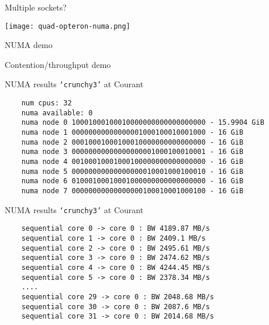 \documentclass[english,compress]{beamer}
\begin{document}
\begin{frame}{Multiple sockets?}
  \begin{center}
    \texttt{[image: quad-opteron-numa.png]}
  \end{center}
  \uncover<+->{}
\end{frame}
\begin{frame}{NUMA demo}
  \begin{center}
  \Huge Contention/throughput demo
  \end{center}
\end{frame}
\begin{frame}[fragile]{NUMA results}
  \texttt{`crunchy3'} at Courant

  \medskip
  \begin{lstlisting}
    num cpus: 32
    numa available: 0
    numa node 0 10001000100010000000000000000000 - 15.9904 GiB
    numa node 1 00000000000000001000100010001000 - 16 GiB
    numa node 2 00010001000100010000000000000000 - 16 GiB
    numa node 3 00000000000000000001000100010001 - 16 GiB
    numa node 4 00100010001000100000000000000000 - 16 GiB
    numa node 5 00000000000000000010001000100010 - 16 GiB
    numa node 6 01000100010001000000000000000000 - 16 GiB
    numa node 7 00000000000000000100010001000100 - 16 GiB
  \end{lstlisting}
\end{frame}
\begin{frame}[fragile]{NUMA results}
  \texttt{`crunchy3'} at Courant

  \medskip
  \begin{lstlisting}
    sequential core 0 -> core 0 : BW 4189.87 MB/s
    sequential core 1 -> core 0 : BW 2409.1 MB/s
    sequential core 2 -> core 0 : BW 2495.61 MB/s
    sequential core 3 -> core 0 : BW 2474.62 MB/s
    sequential core 4 -> core 0 : BW 4244.45 MB/s
    sequential core 5 -> core 0 : BW 2378.34 MB/s
    ....
    sequential core 29 -> core 0 : BW 2048.68 MB/s
    sequential core 30 -> core 0 : BW 2087.6 MB/s
    sequential core 31 -> core 0 : BW 2014.68 MB/s
  \end{lstlisting}
\end{frame}
\end{document}
